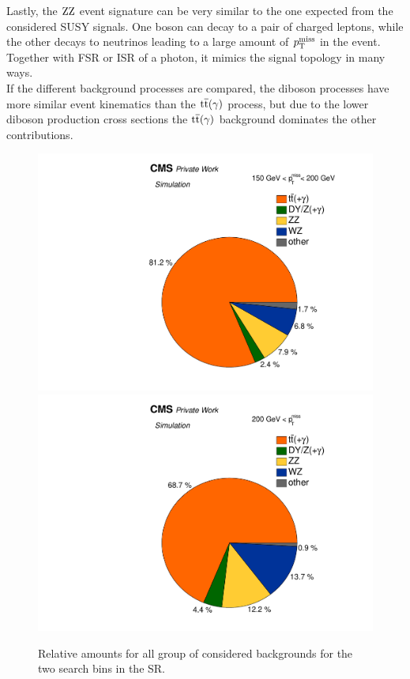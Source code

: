 Lastly, the $\mathrm{Z}\mathrm{Z}$ event signature can be very similar to the one expected from the considered SUSY signals. One boson can decay to a pair of charged leptons, while the other decays to neutrinos leading to a large amount of $p_{\mathrm{T}}^\text{miss}$ in the event. Together with FSR or ISR of a photon, it mimics the signal topology in many ways.\\
If the different background processes are compared, the diboson processes have more similar event kinematics than the ${\mathrm{t}\overline{\mathrm{t}}}(\gamma)$ process, but due to the lower diboson production cross sections the ${\mathrm{t}\overline{\mathrm{t}}}(\gamma)$ background dominates the other contributions.
\begin{figure}[tbp]
 \centering
 \includegraphics[width=\pairwidth]{figures/figures/pie1}
 \includegraphics[width=\pairwidth]{figures/figures/pie2}
 \caption{Relative amounts for all group of considered backgrounds for the two search bins in the SR.}
 \label{fig:PieCharts}
\end{figure}
